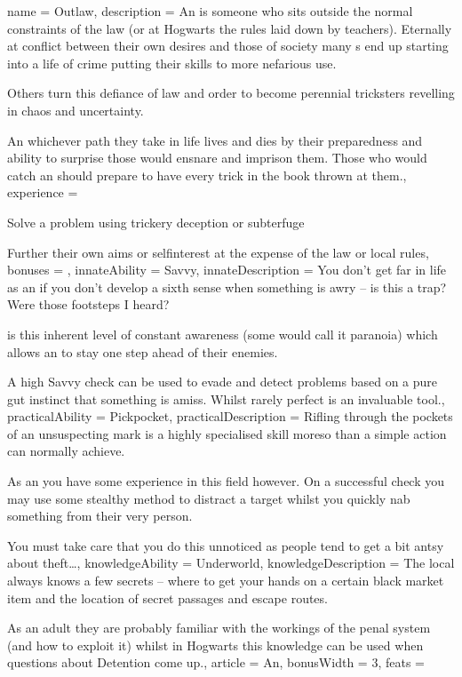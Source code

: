 \archetype
{
	name = Outlaw,
	description = An \bname{} is someone who sits outside the normal constraints of the law (or \comma{} at Hogwarts\comma{} the rules laid down by teachers). Eternally at conflict between their own desires and those of society\comma{} many \bname{}s end up starting into a life of crime\comma{} putting their skills to more nefarious use. 

Others turn this defiance of law and order to become perennial tricksters\comma{} revelling in chaos and uncertainty. 

An \bname{}\comma{} whichever path they take in life\comma{} lives and dies by their preparedness and ability to surprise those would ensnare and imprison them. Those who would catch an \bname{} should prepare to have every trick in the book thrown at them.,
	experience = \item Solve a problem using trickery\comma{} deception or subterfuge
\item Further their own aims or self\minus{}interest at the expense of the law or local rules,
	bonuses = 
,
	innateAbility = Savvy,
	innateDescription = You don’t get far in life as an \bname{} if you don’t develop a sixth sense when something is awry – is this a trap? Were those footsteps I heard? 

 is this inherent level of constant awareness (some would call it paranoia)\comma{} which allows an \bname{} to stay one step ahead of their enemies. 

A high Savvy check can be used to evade and detect problems based on a pure gut instinct that something is amiss. Whilst rarely perfect\comma{}  is an invaluable tool.,
	practicalAbility = Pickpocket,
	practicalDescription = Rifling through the pockets of an unsuspecting mark is a highly specialised skill\comma{} moreso than a simple  action can normally achieve. 

As an \bname{}\comma{} you have some experience in this field however. On a successful  check you may use some stealthy method to distract a target whilst you quickly nab something from their very person. 

You must take care that you do this unnoticed\comma{} as people tend to get a bit antsy about theft…,
	knowledgeAbility = Underworld,
	knowledgeDescription = The local \bname{} always knows a few secrets – where to get your hands on a certain black market item\comma{} and the location of secret passages and escape routes. 

As an adult\comma{} they are probably familiar with the workings of the penal system (and how to exploit it)\comma{} whilst in Hogwarts\comma{} this knowledge can be used when questions about Detention come up.,
	article = An,
	bonusWidth = 3, feats = \OutlawFeats
}

